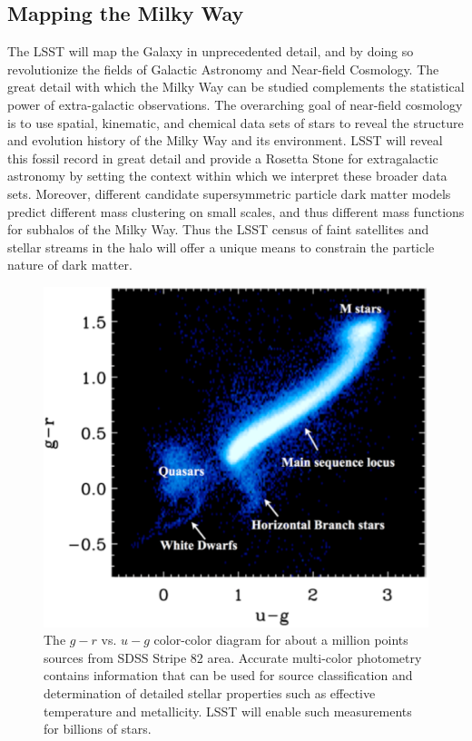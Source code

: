 \documentclass{emulateapj}
\begin{document}
\subsection{Mapping the Milky Way }

The LSST will map the Galaxy in unprecedented detail, and by doing so revolutionize the fields of Galactic 
Astronomy and Near-field Cosmology. The great detail with which the Milky Way can be studied complements 
the statistical power of extra-galactic observations.  The overarching goal of near-field cosmology is to use 
spatial, kinematic, and chemical data sets of stars to reveal the structure and evolution history of the Milky Way
and its environment. LSST will reveal this fossil record in great detail and provide a Rosetta Stone for extragalactic 
astronomy by setting the context within which we interpret these
broader data sets. Moreover, different candidate supersymmetric
particle dark matter models predict different mass clustering on small
scales, and thus different mass functions for subhalos of the Milky
Way.  Thus the LSST census of faint satellites and stellar streams in
the halo will offer a unique means to constrain the 
particle nature of dark matter.  


\begin{figure}
\includegraphics[width=1.0\hsize,clip]{MarlaUGR.pdf}
\caption{The $g-r$ vs. $u-g$ color-color diagram for about a million points sources 
from SDSS Stripe 82 area. Accurate multi-color photometry 
contains information that can be used for source classification and determination of 
detailed stellar properties such as effective temperature and metallicity. LSST will 
enable such measurements for billions of stars.} 
\label{Fig:FeH}
\end{figure}
\end{document}

